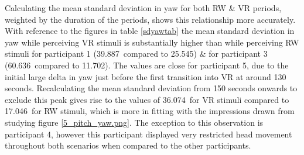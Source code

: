 Calculating the mean standard deviation in yaw for both RW \& VR periods, weighted by the duration of the periods, shows this relationship more accurately. With reference to the figures in table \ref{sdyawtab} the mean standard deviation in yaw while perceiving VR stimuli is substantially higher than while perceiving RW stimuli for participant 1 (39.887\textdegree\ compared to 25.545\textdegree) \& for participant 3 (60.636\textdegree\ compared to 11.702\textdegree). The values are close for participant 5, due to the initial large delta in yaw just before the first transition into VR at around 130 seconds. Recalculating the mean standard deviation from 150 seconds onwards to exclude this peak gives rise to the values of 36.074\textdegree\ for VR stimuli compared to 17.046\textdegree\ for RW stimuli, which is more in fitting with the impressions drawn from studying figure \ref{5_pitch_yaw.png}. The exception to this observation is participant 4, however this participant displayed very restricted head movement throughout both scenarios when compared to the other participants.

